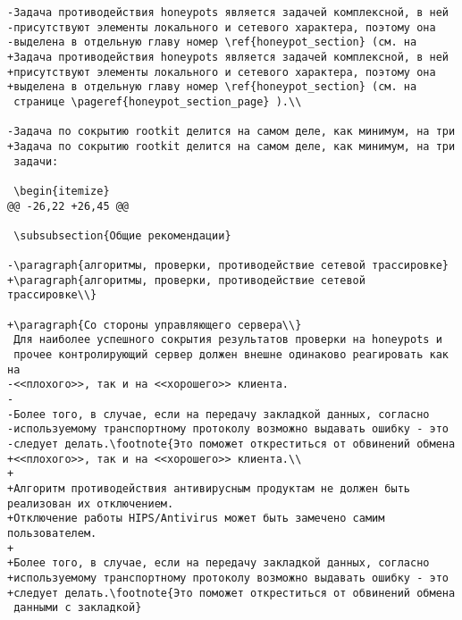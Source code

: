 \begin{verbatim}
-Задача противодействия honeypots является задачей комплексной, в ней
-присутствуют элементы локального и сетевого характера, поэтому она
-выделена в отдельную главу номер \ref{honeypot_section} (см. на
+Задача противодействия honeypots является задачей комплексной, в ней
+присутствуют элементы локального и сетевого характера, поэтому она
+выделена в отдельную главу номер \ref{honeypot_section} (см. на
 странице \pageref{honeypot_section_page} ).\\

-Задача по сокрытию rootkit делится на самом деле, как минимум, на три
+Задача по сокрытию rootkit делится на самом деле, как минимум, на три
 задачи:

 \begin{itemize}
@@ -26,22 +26,45 @@

 \subsubsection{Общие рекомендации}

-\paragraph{алгоритмы, проверки, противодействие сетевой трассировке}
+\paragraph{алгоритмы, проверки, противодействие сетевой трассировке\\}

+\paragraph{Со стороны управляющего сервера\\}
 Для наиболее успешного сокрытия результатов проверки на honeypots и
 прочее контролирующий сервер должен внешне одинаково реагировать как на
-<<плохого>>, так и на <<хорошего>> клиента.
-
-Более того, в случае, если на передачу закладкой данных, согласно
-используемому транспортному протоколу возможно выдавать ошибку - это
-следует делать.\footnote{Это поможет откреститься от обвинений обмена
+<<плохого>>, так и на <<хорошего>> клиента.\\
+
+Алгоритм противодействия антивирусным продуктам не должен быть реализован их отключением.
+Отключение работы HIPS/Antivirus может быть замечено самим пользователем.
+
+Более того, в случае, если на передачу закладкой данных, согласно
+используемому транспортному протоколу возможно выдавать ошибку - это
+следует делать.\footnote{Это поможет откреститься от обвинений обмена
 данными с закладкой}


\end{verbatim}
